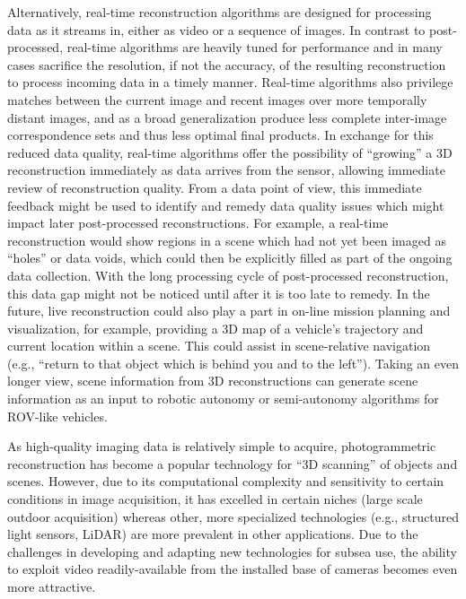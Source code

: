 \documentclass[letterpaper,12pt]{article}
\begin{document}
Alternatively, real-time reconstruction algorithms are designed for processing data as it streams in, either as video or a sequence of images.   In contrast to post-processed, real-time algorithms are heavily tuned for performance and in many cases sacrifice the resolution, if not the accuracy, of the resulting reconstruction to process incoming data in a timely manner.   Real-time algorithms also privilege matches between the current image and recent images over more temporally distant images, and as a broad generalization produce less complete inter-image correspondence sets and thus less optimal final products.   In exchange for this reduced data quality, real-time algorithms offer the possibility of ``growing'' a 3D reconstruction immediately as data arrives from the sensor, allowing immediate review of reconstruction quality.    From a data point of view, this immediate feedback might be used to identify and remedy data quality issues which might impact later post-processed reconstructions.  For example, a real-time reconstruction would show regions in a scene which had not yet been imaged as ``holes'' or data voids, which could then be explicitly filled as part of the ongoing data collection.   With the long processing cycle of post-processed reconstruction, this data gap might not be noticed until after it is too late to remedy.  In the future,  live reconstruction could also play a part in on-line mission planning and visualization, for example, providing a 3D map of a vehicle's trajectory and current location within a scene.  This could assist in scene-relative navigation (e.g., ``return to that object which is behind you and to the left'').    Taking an even longer view, scene information from 3D reconstructions can generate scene information as an input to robotic autonomy or semi-autonomy algorithms for ROV-like vehicles.  

As high-quality imaging data is relatively simple to acquire, photogrammetric reconstruction has become a popular technology for ``3D scanning'' of objects and scenes.  However, due to its computational complexity and sensitivity to certain conditions in image acquisition, it has excelled in certain niches (large scale outdoor acquisition) whereas other, more specialized technologies (e.g., structured light sensors, LiDAR) are more prevalent in other applications.      Due to the challenges in developing and adapting new technologies for subsea use, the ability to exploit video readily-available from the installed base of cameras becomes even more attractive.
\end{document}
